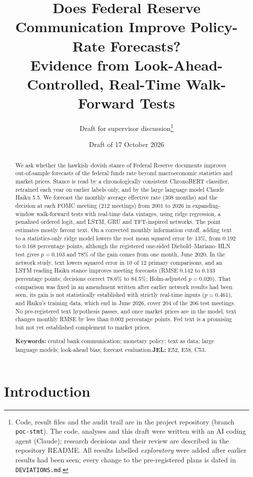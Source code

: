 \documentclass[11pt]{article}
\title{Does Federal Reserve Communication Improve Policy-Rate Forecasts?\\[4pt]
\large Evidence from Look-Ahead-Controlled, Real-Time Walk-Forward Tests}
\author{Draft for supervisor discussion\thanks{Code, result files and the audit trail are in the project
repository (branch \texttt{poc-stmt}). The code, analyses and this draft were written with an AI coding agent
(Claude); research decisions and their review are described in the repository README. All results labelled \emph{exploratory} were added after
earlier results had been seen; every change to the pre-registered plans is dated in \texttt{DEVIATIONS.md}.}}
\date{Draft of 17 October 2026}
\begin{document}
\maketitle

\begin{abstract}
\noindent
We ask whether the hawkish--dovish stance of Federal Reserve documents improves out-of-sample forecasts of the
federal funds rate beyond macroeconomic statistics and market prices. Stance is read by a chronologically
consistent ChronoBERT classifier, retrained each year on earlier labels only, and by the large language model
Claude Haiku 5.5. We forecast the monthly average effective rate (308 months) and the decision at each FOMC meeting
(212 meetings) from 2001 to 2026 in expanding-window walk-forward tests with real-time data vintages, using ridge
regression, a penalised ordered logit, and LSTM, GRU and TFT-inspired networks. The point estimates mostly favour
text. On a corrected monthly information cutoff, adding text to a statistics-only ridge model lowers the root mean
squared error by 13\%, from 0.192 to 0.168 percentage points, although the registered one-sided
Diebold--Mariano--HLN test gives $p=0.103$ and 78\% of the gain comes from one month, June 2020. In the network
study, text lowers squared error in 10 of 12 primary comparisons, and an LSTM reading Haiku stance improves meeting
forecasts (RMSE 0.142 to 0.133 percentage points; decisions correct 78.6\% to 84.5\%; Holm-adjusted $p=0.020$).
That comparison was fixed in an amendment written after earlier network results had been seen, its gain is not
statistically established with strictly real-time inputs ($p=0.461$), and Haiku's training data, which end in June
2026, cover 204 of the 206 test meetings. No pre-registered text hypothesis passes, and once market prices are in
the model, text changes monthly RMSE by less than 0.002 percentage points. Fed text is a promising but not yet
established complement to market prices.

\medskip
\noindent\textbf{Keywords:} central bank communication; monetary policy; text as data; large language models;
look-ahead bias; forecast evaluation.\quad \textbf{JEL:} E52, E58, C53.
\end{abstract}

\newpage

\section{Introduction}
\end{document}
